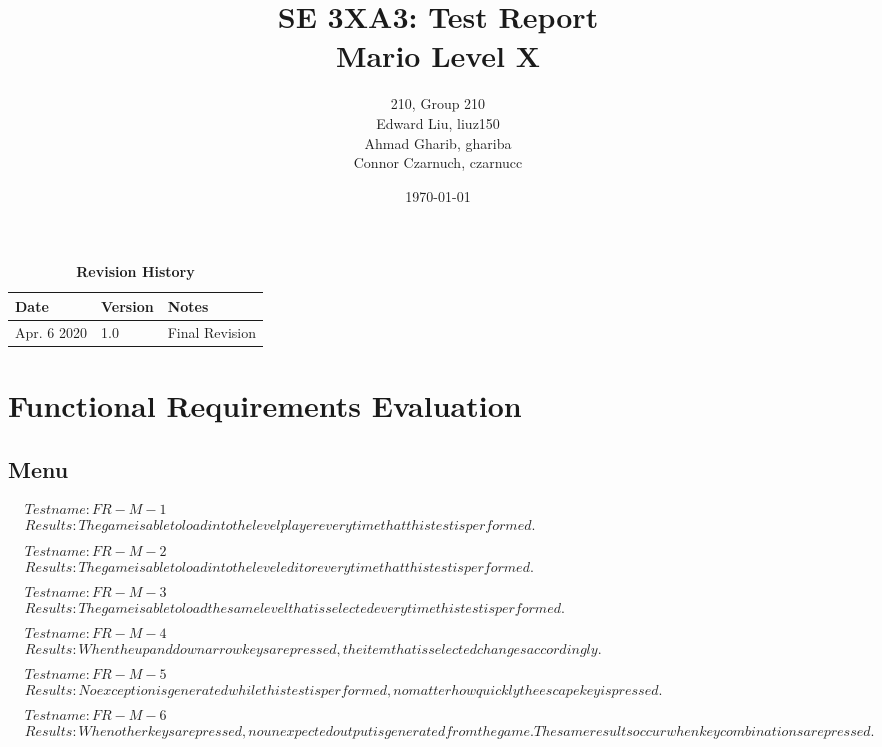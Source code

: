 \documentclass[12pt, titlepage]{article}
\title{SE 3XA3: Test Report\\Mario Level X}
\author{210, Group 210
		\\ Edward Liu, liuz150
		\\ Ahmad Gharib, ghariba
		\\ Connor Czarnuch, czarnucc
}
\date{\today}
\begin{document}
\maketitle

\tableofcontents
\listoftables

\begin{table}[bp]
\caption{\bf Revision History}
\begin{tabularx}{\textwidth}{p{3cm}p{2cm}X}
\toprule {\bf Date} & {\bf Version} & {\bf Notes}\\
\midrule
Apr. 6 2020 & 1.0 & Final Revision\\
\bottomrule
\end{tabularx}
\end{table}

\newpage


\section{Functional Requirements Evaluation}

\subsection{Menu}
\begin{align}
& Test name: FR-M-1\\
& Results: The game is able to load into the level player every time that this test is performed.\\\\
& Test name: FR-M-2\\
& Results: The game is able to load into the level editor every time that this test is performed.\\\\
& Test name: FR-M-3\\
& Results: The game is able to load the same level that is selected every time this test is performed.\\\\
& Test name: FR-M-4\\
& Results: When the up and down arrow keys are pressed, the item that is selected changes accordingly.\\\\
& Test name: FR-M-5\\
& Results: No exception is generated while this test is performed, no matter how quickly the escape key is pressed.\\\\
& Test name: FR-M-6\\
& Results: When other keys are pressed, no unexpected output is generated from the game. The same results occur when key combinations are pressed.\\
\end{align}
\end{document}
